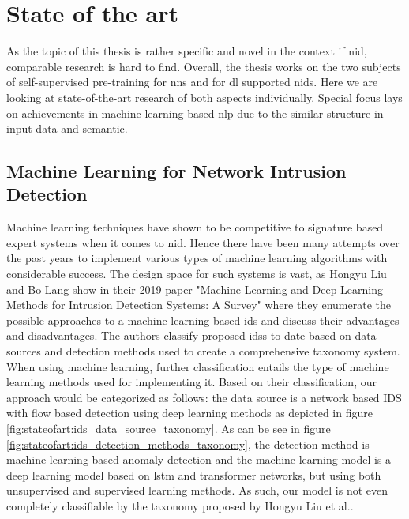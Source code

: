 \chapter{State of the art} \label{sec:stateofart}

As the topic of this thesis is rather specific and novel in the context if \gls{nid}, comparable research is hard to find. Overall, the thesis works on the two subjects of self-supervised pre-training for \glspl{nn} and for \gls{dl} supported \gls{nids}. Here we are looking at state-of-the-art research of both aspects individually. Special focus lays on achievements in machine learning based \gls{nlp} due to the similar structure in input data and semantic.

\section{Machine Learning for Network Intrusion Detection} \label{sec:stateofart:nid}

Machine learning techniques have shown to be competitive to signature based expert systems when it comes to \gls{nid}. Hence there have been many attempts over the past years to implement various types of machine learning algorithms with considerable success. The design space for such systems is vast, as Hongyu Liu and Bo Lang show in their 2019 paper \cite{nid_ml_survey_2019} "Machine Learning and Deep Learning Methods for Intrusion Detection Systems: A Survey" where they enumerate the possible approaches to a machine learning based \gls{ids} and discuss their advantages and disadvantages. The authors classify proposed \glspl{ids} to date based on data sources and detection methods used to create a comprehensive taxonomy system. When using machine learning, further classification entails the type of machine learning methods used for implementing it. Based on their classification, our approach would be categorized as follows: the data source is a network based IDS with flow based detection using deep learning methods as depicted in figure \ref{fig:stateofart:ids_data_source_taxonomy}. As can be see in figure \ref{fig:stateofart:ids_detection_methods_taxonomy}, the detection method is machine learning based anomaly detection and the machine learning model is a deep learning model based on \gls{lstm} and transformer networks, but using both unsupervised and supervised learning methods. As such, our model is not even completely classifiable by the taxonomy proposed by Hongyu Liu et al.. \par

